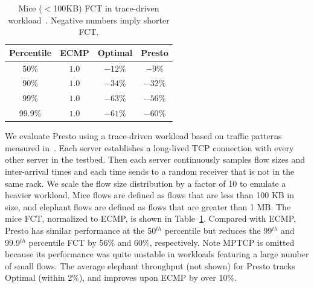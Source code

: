 \fi

\begin{table}[!tb]
\begin{center}
\begin{tabular}{ |c|c|c|c| }
 \hline
 Percentile & ECMP & Optimal &Presto \\
 \hline
 50\%   & $1.0$ & $-12\%$ & $-9\%$   \\
 90\%   & $1.0$ & $-34\%$ & $-32\%$  \\
 99\%   & $1.0$ & $-63\%$  & $-56\%$ \\
 99.9\% & $1.0$ & $-61\%$ & $-60\%$  \\
 \hline

\end{tabular}
\caption{Mice ($<$100KB) FCT in trace-driven workload~\cite{kandula2009nature}. Negative numbers imply shorter FCT.}
        \label{macro_evaluation_MSR_trace_driven}
\end{center}
\end{table}

We evaluate Presto using a trace-driven workload based on traffic patterns measured in~\cite{kandula2009nature}. 
Each server establishes a long-lived TCP connection 
with every other server in the testbed. 
Then each server continuously samples flow sizes and inter-arrival times and each time sends to a random receiver
that is not in the same rack.
We scale the flow size distribution by a factor of 10 to emulate a heavier workload. 
Mice flows are defined as flows that are less than 100 KB in size, and elephant flows are defined as flows
that are greater than 1 MB. The mice FCT, normalized to ECMP, 
is shown in Table~\ref{macro_evaluation_MSR_trace_driven}. 
Compared with ECMP, Presto has similar performance at the 50$^{th}$ percentile but reduces the 99$^{th}$ and 99.9$^{th}$ percentile FCT by 56\% and 60\%, respectively. 
Note MPTCP is omitted because its performance was quite unstable in workloads
featuring a large number of small flows.
The average elephant throughput (not shown) for Presto tracks Optimal (within 2\%), and improves upon ECMP by over 10\%.


